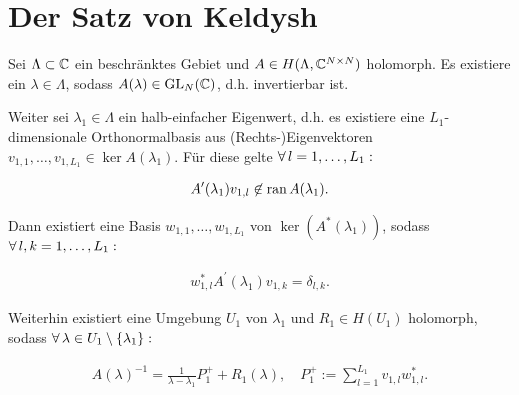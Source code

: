 \section{Der Satz von Keldysh}

\begin{theorem} \label{keldysh_nicht_linear}

    Sei $\Lambda \subset \mathbb{C}$ ein beschränktes Gebiet und $A \in H(\Lambda, \mathbb{C}^{N \times N})$ holomorph.
    Es existiere ein $\lambda \in \Lambda$, sodass $A(\lambda) \in \operatorname{GL}_N(\mathbb{C})$, d.h. invertierbar ist.

    Weiter sei $\lambda_1 \in \Lambda$ ein halb-einfacher Eigenwert, d.h. es existiere eine $L_1$-dimensionale Orthonormalbasis aus (Rechts-)Eigenvektoren $v_{1, 1}, \dots, v_{1, L_1} \in \ker A(\lambda_1)$.
    Für diese gelte $\forall \, l = 1, \dots, L_1:$
    
    \begin{align*}
        A^\prime(\lambda_1) v_{1, l}
        \not \in
        \operatorname{ran} A(\lambda_1).
    \end{align*}

    Dann existiert eine Basis $w_{1, 1}, \dots, w_{1, L_1}$ von $\ker(A^\ast(\lambda_1))$, sodass $\forall \, l, k = 1, \dots, L_1:$

    \begin{align}
        w_{1, l}^\ast A^\prime(\lambda_1) v_{1, k} = \delta_{l, k}.
    \end{align}

    Weiterhin existiert eine Umgebung $U_1$ von $\lambda_1$ und $R_1 \in H(U_1)$ holomorph, sodass $\forall \, \lambda \in U_1 \setminus {\left \{ \lambda_1 \right \}}:$

    \begin{align}
        A(\lambda)^{-1}
        =
        \frac{1}{\lambda - \lambda_1} P_1^+
        +
        R_1(\lambda),
        \quad
        P_1^+
        :=
        \sum_{l=1}^{L_1}
            v_{1, l} w_{1, l}^\ast.
    \end{align}

\end{theorem}

